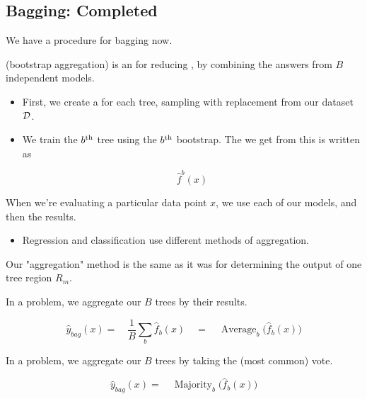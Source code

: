     \phantom{}

    \subsection{Bagging: Completed}


        We have a procedure for bagging now.\\
        
        \begin{definition}
             (bootstrap aggregation) is an  for reducing , by combining the answers from $B$ independent models.

            \begin{itemize}
                \item First, we create a  for each tree, sampling with replacement from our dataset ${\cal D}$.

                \item We train the $b^{ \text{th} }$ tree using the $b^{ \text{th} }$ bootstrap. The  we get from this is written as

                \begin{equation*}
                    \hat{f}^b(x)
                \end{equation*}
            \end{itemize}

            When we're evaluating a particular data point $x$, we use each of our models, and then  the results.

            \begin{itemize}
                \item Regression and classification use different methods of aggregation.
            \end{itemize}
        \end{definition}

        Our "aggregation" method is the same as it was for determining the output of one tree region $R_m$.\\

        \begin{kequation}
            In a  problem, we aggregate our $B$ trees by  their results.

            \begin{equation*}
                \hat{y}_{bag}(x) =\quad \frac{1}{B} \sum_b \hat{f}_b(x) \quad = \quad\operatorname{Average}_b \Big( \hat{f}_b(x) \Big)
            \end{equation*}

            In a  problem, we aggregate our $B$ trees by taking the  (most common) vote.

            \begin{equation*}
                \hat{y}_{bag}(x) = \quad \operatorname{Majority}_b \Big( \hat{f}_b(x) \Big)
            \end{equation*}
        \end{kequation}

